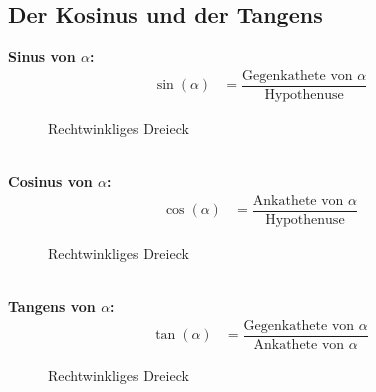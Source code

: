 \subsection{Der Kosinus und der Tangens}
\textbf{Sinus von $\alpha$:}
\begin{align}
  \sin(\alpha) & = \dfrac{\text{Gegenkathete von $\alpha$}}{\text{Hypothenuse}} \tag{1}
\end{align}
\begin{figure}[hb!]
  \centering
  \def\svgwidth{200px}
  
  \caption{Rechtwinkliges Dreieck}
  \label{fig:rechtwinkliges_dreieck_sinus}
\end{figure}
\\
\textbf{Cosinus von $\alpha$:}
\begin{align}
  \cos(\alpha) & = \dfrac{\text{Ankathete von $\alpha$}}{\text{Hypothenuse}} \tag{1}
\end{align}
\begin{figure}[hb!]
  \centering
  \def\svgwidth{200px}
  
  \caption{Rechtwinkliges Dreieck}
  \label{fig:rechtwinkliges_dreieck_cosinus}
\end{figure}
\\
\textbf{Tangens von $\alpha$:}
\begin{align}
  \tan(\alpha) & = \dfrac{\text{Gegenkathete von $\alpha$}}{\text{Ankathete von $\alpha$}} \tag{1}
\end{align}
\begin{figure}[hb!]
  \centering
  \def\svgwidth{200px}
  
  \caption{Rechtwinkliges Dreieck}
  \label{fig:rechtwinkliges_dreieck_tangens}
\end{figure}